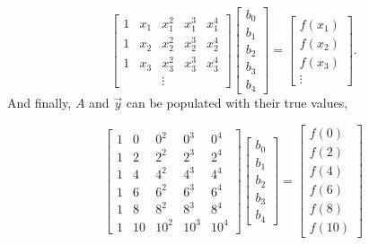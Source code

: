 \begin{equation} \label{LinAlgSubscript}
\begin{bmatrix}
1 & x_1 & x_1^2 & x_1^3 & x_1^4 \\
1 & x_2 & x_2^2 & x_2^3 & x_2^4 \\
1 & x_3 & x_3^2 & x_3^3 & x_3^4 \\
 & & \vdots & &
\end{bmatrix}
\begin{bmatrix}
b_0 \\
b_1 \\
b_2 \\
b_3 \\
b_4 
\end{bmatrix}
=
\begin{bmatrix}
f(x_1) \\ 
f(x_2) \\
f(x_3) \\ 
\vdots
\end{bmatrix}.
\end{equation}
And finally, $A$ and $\vec{y}$ can be populated with their true values,

\begin{equation} \label{realValues}
\begin{bmatrix}
1 & 0 & 0^2 & 0^3 & 0^4 \\
1 & 2 & 2^2 & 2^3 & 2^4 \\
1 & 4 & 4^2 & 4^3 & 4^4 \\
1 & 6 & 6^2 & 6^3 & 6^4 \\
1 & 8 & 8^2 & 8^3 & 8^4 \\
1 & 10 & 10^2 & 10^3 & 10^4
\end{bmatrix}
\begin{bmatrix}
b_0 \\
b_1 \\
b_2 \\
b_3 \\
b_4 
\end{bmatrix}
=
\begin{bmatrix}
f(0) \\ 
f(2) \\
f(4) \\ 
f(6) \\
f(8) \\
f(10)
\end{bmatrix}
\end{equation}

